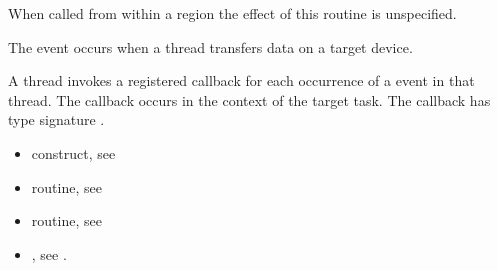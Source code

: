 \begin{ccppspecific}
When called from within a  region 
the effect of this routine is unspecified.


\events
The  event occurs when a thread transfers data on a target device.

\tools

A thread invokes a registered 
callback for each occurrence of a  event in that thread. 
The callback occurs in the context of the target task.  The callback has type signature
. 


\newpage
{}
\crossreferences
\begin{itemize}
\item {} construct, see 

\item {} routine, see 

\item {} routine, see 


\item {}, see 
.

\end{itemize}

\subsection{}
\label{subsec:omp_target_associate_ptr}
\summary


\end{ccppspecific}
